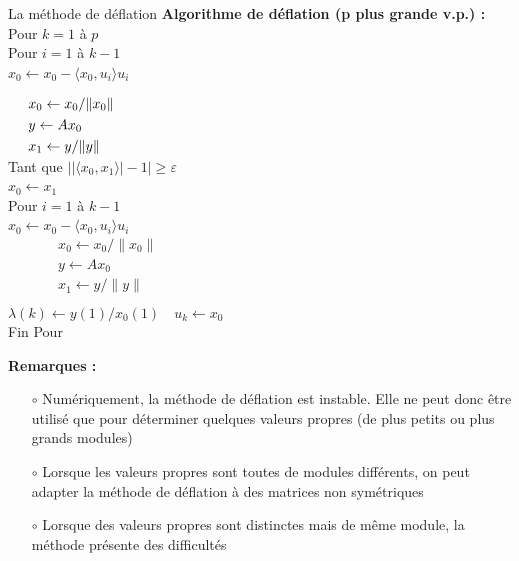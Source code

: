 \documentclass[french, 10pt]{beamer}
\theoremstyle{definition}
\begin{document}
\begin{frame}{La méthode de déflation}
	\textbf{Algorithme de déflation (p plus grande v.p.) :} \\
	Pour $k=1$ à $p$\\
	\hspace*{0.4cm} Pour $i=1$  à $ k-1$ \\
	\hspace*{1cm} $x_0 \leftarrow x_0 - \langle x_0, u_i\rangle u_i$
	
	$
	\begin{aligned}
		& \hspace{0.5cm} x_0 \leftarrow x_0 / \|x_0\| \\
		& \hspace{0.5cm} y \leftarrow A x_0 \\
		& \hspace{0.5cm} x_1 \leftarrow y / \|y\|
	\end{aligned}
	$ \\
	\hspace*{0.4cm} Tant que $\left|\left|\langle x_0, x_1\rangle \right|-1\right| \geq \varepsilon$\\
	\hspace*{1cm} $x_0 \leftarrow x_1$\\
	\hspace*{1cm} Pour $i=1$ à $k-1$\\
	\hspace*{1.5cm} $x_0 \leftarrow x_0 - \langle x_0, u_i\rangle u_i$\\
	$
	\begin{aligned}
		& \hspace{1cm} x_0 \leftarrow x_0 / \|x_0\| \\
		& \hspace{1cm} y \leftarrow A x_0 \\
		& \hspace{1cm} x_1 \leftarrow y / \|y\| \\
	\end{aligned}
	$
	\\ \hspace*{0.4cm} $\lambda(k) \leftarrow y(1) / x_0(1) \quad u_k \leftarrow x_0$
	\\ Fin Pour
\end{frame}
\begin{frame}
	
	\textbf{Remarques :}
	\begin{itemize}
		\item[$\circ$] Numériquement, la méthode de déflation est instable. 
		Elle ne peut donc être utilisé que pour déterminer 
		quelques valeurs propres (de plus petits ou plus grands 
		modules)
		\item[$\circ$] Lorsque les valeurs propres sont toutes de modules 
		différents, on peut adapter la méthode de déflation à 
		des matrices non symétriques
		\item[$\circ$] Lorsque des valeurs propres sont distinctes mais de 
		même module, la méthode présente des difficultés
	\end{itemize}
	
\end{frame}
\end{document}
